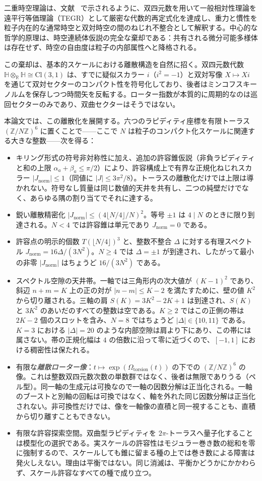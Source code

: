 \documentclass[a4paper]{article}
\theoremstyle{definition}
\newcommand{\Jnorm}{J_{\mathrm{norm}}}
\begin{document}
二重時空理論は、文献~\cite{main-paper} で示されるように、双四元数を用いて一般相対性理論を遠平行等価理論（TEGR）として厳密な代数的再定式化を達成し、重力と慣性を粒子内在的な通常時空と双対時空の間のねじれ不整合として解釈する。中心的な哲学的原理は、時空連続体仮説の完全な棄却である：共有される微分可能多様体は存在せず、時空の自由度は粒子の内部属性へと降格される。

この棄却は、基本的スケールにおける離散構造を自然に招く。双四元数代数 $\mathbb{H} \otimes_{\mathbb{R}} \mathbb{H} \cong \mathrm{Cl}(3,1)$ は、すでに疑似スカラー $i$（$i^2 = -1$）と双対写像 $X \mapsto Xi$ を通じて双対セクターのコンパクト性を符号化しており、後者はミンコフスキーノルムを保存しつつ時間矢を反転する。ローター指数が本質的に周期的なのは巡回セクターのみであり、双曲セクターはそうではない。

本論文では、この離散化を展開する。六つのラピディティ座標を有限トーラス $(\mathbb{Z}/N\mathbb{Z})^6$ に置くことで——ここで $N$ は粒子のコンパクト化スケールに関連する大きな整数——次を得る：
\begin{itemize}
  \item キリング形式の符号非対称性に加え、追加の許容錐仮説（非負ラピディティと和の上限 $\alpha_a+\beta_a\le\pi/2$）により、許容構成上で有界な正規化ねじれスカラー $|\Jnorm| \leq 1$（同値に $|J| \leq 3\pi^2/8$）。トーラスの離散化だけでは上限は導かれない。符号なし質量は同じ数値的天井を共有し、二つの純壁だけでなく、あらゆる隅の割り当てでそれに達する。
  \item 鋭い離散精密化 $|\Jnorm|\leq (4\lfloor N/4\rfloor/N)^2$。等号 $\pm 1$ は $4\mid N$ のときに限り到達される。$N<4$ では許容錐は単元であり $\Jnorm=0$ である。
  \item 許容点の明示的個数 $T(\lfloor N/4\rfloor)^3$ と、整数不整合 $\Delta$ に対する有理スペクトル $\Jnorm=16\Delta/(3N^2)$。$N\geq 4$ では $\Delta=\pm 1$ が到達され、したがって最小の非零 $|\Jnorm|$ はちょうど $16/(3N^2)$ である。
  \item スペクトル空隙の天井帯。一軸では三角形内の次大値が $(K-1)^2$ であり、斜辺 $n+m=K$ 上の正の対が $|n-m|\leq K-2$ を満たすために、壁の値 $K^2$ から切り離される。三軸の肩 $S(K)=3K^2-2K+1$ は到達され、$S(K)$ と $3K^2$ のあいだのすべての整数は空である。$K\geq 2$ ではこの正側の帯は $2K-2$ 個のスロットを含み、$N=8$ ではちょうど $|\Delta|\in\{10,11\}$ である。$K=3$ における $|\Delta|=20$ のような内部空隙は肩より下にあり、この帯には属さない。帯の正規化幅は $4$ の倍数に沿って零に近づくので、$[-1,1]$ における稠密性は保たれる。
  \item 有限な\emph{離散ローター像}：$t\mapsto\exp(\Omega_{\mathrm{torsion}}(t))$ の下での $(\mathbb{Z}/N\mathbb{Z})^6$ の像。これは整数双四元数次数の単数群ではなく、後者は無限でありうる（ペル型）。同一軸の生成元は可換なので一軸の因数分解は正当化される。一軸のブーストと別軸の回転は可換ではなく、軸を外れた同じ因数分解は正当化されない。非可換性だけでは、像を一軸像の直積と同一視することも、直積から切り離すこともできない。
  \item 有限な許容探索空間。双曲型ラピディティを $2\pi$-トーラスへ量子化することは模型化の選択である。実スケールの許容性はモジュラー巻き数の総和を零に強制するので、スケールしても錐に留まる種の上では巻き数による障害は発火しえない。理由は平衡ではない。同じ消滅は、平衡かどうかにかかわらず、スケール許容なすべての種で成り立つ。
\end{itemize}
\end{document}
